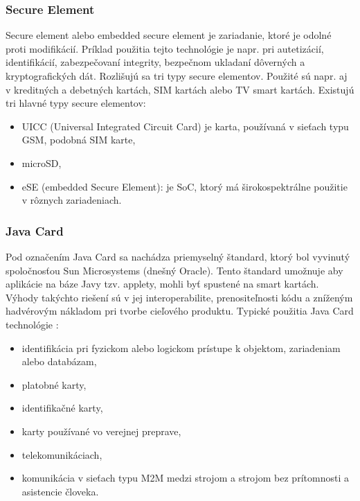 \documentclass[12pt,a4wide,oneside,openright]{report}
\begin{document}
\subsubsection{Secure Element} \label{s_se}
Secure element alebo embedded secure element je zariadanie, ktoré je odolné proti modifikácií. Príklad použitia tejto technológie je napr. pri autetizácií, identifikácií, zabezpečovaní integrity, bezpečnom ukladaní dôverných a kryptografických dát. Rozlišujú sa tri typy secure elementov. Použité sú napr. aj v kreditných a debetných kartách, SIM kartách alebo TV smart kartách. \cite{gp}\cite{gemalto}
Existujú tri hlavné typy secure elementov:
\begin{itemize}
	\item UICC (Universal Integrated Circuit Card) je karta, používaná v sieťach typu GSM, podobná SIM karte,
	\item microSD,
	\item eSE (embedded Secure Element): je SoC, ktorý má širokospektrálne použitie v rôznych zariadeniach.
\end{itemize}
\onehalfspacing

\subsubsection{Java Card} \label{s_jc}
Pod označením Java Card sa nachádza priemyselný štandard, ktorý bol vyvinutý spoločnosťou Sun Microsystems (dnešný Oracle). Tento štandard umožnuje aby aplikácie na báze Javy tzv. applety, mohli byť spustené na smart kartách. Výhody takýchto riešení sú v jej interoperabilite, prenositeľnosti kódu a zníženým hadvérovým nákladom pri tvorbe cieľového produktu.
Typické použitia Java Card technológie \cite{jcop}:
\begin{itemize}
	\item identifikácia pri fyzickom alebo logickom prístupe k objektom, zariadeniam alebo databázam,
	\item platobné karty,
	\item identifikačné karty,
	\item karty používané vo verejnej preprave,
	\item telekomunikáciach,
	\item komunikácia v sieťach typu M2M medzi strojom a strojom bez prítomnosti a asistencie človeka.
\end{itemize}
\onehalfspacing
\end{document}
